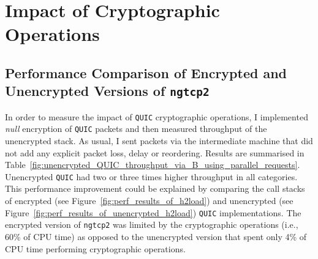 \documentclass[12pt,a4paper]{report}
\newcommand\note[2]{{\color{#1}\bf #2}}
\newcommand\simon[1]{\ifcomments{\note{cyan}{SM: #1}}\fi}
\begin{document}
\section{Impact of Cryptographic Operations}




\subsection{Performance Comparison of Encrypted and Unencrypted Versions of \texttt{ngtcp2}}

In order to measure the impact of \texttt{QUIC} cryptographic operations, I implemented \textit{null} encryption of \texttt{QUIC} packets and then measured throughput of the unencrypted stack.
As usual, I sent packets via the intermediate machine that did not add any explicit packet loss, delay or reordering.
Results are summarised in Table~\ref{fig:unencrypted_QUIC_throughput_via_B_using_parallel_requests}.
Unencrypted \texttt{QUIC} had two or three times higher throughput in all categories.
This performance improvement could be explained by comparing the call stacks of encrypted (see Figure~\ref{fig:perf_results_of_h2load}) and unencrypted (see Figure~\ref{fig:perf_results_of_unencrypted_h2load}) \texttt{QUIC} implementations.
The encrypted version of \texttt{ngtcp2} was limited by the cryptographic operations (i.e., 60\% of CPU time) as opposed to the unencrypted version that spent only 4\% of CPU time performing cryptographic operations.
\end{document}
